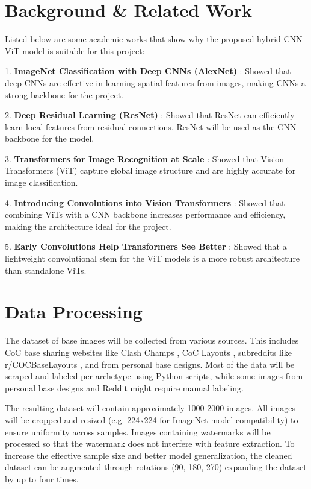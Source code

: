 \documentclass[final]{article}
\begin{document}
\section*{Background \& Related Work}

Listed below are some academic works that show why the proposed hybrid CNN-ViT model is suitable for this project:

1. \textbf{ImageNet Classification with Deep CNNs (AlexNet)} \cite{alexnet}: Showed that deep CNNs are effective in learning spatial features from images, making CNNs a strong backbone for the project.

2. \textbf{Deep Residual Learning (ResNet)} \cite{resnet}: Showed that ResNet can efficiently learn local features from residual connections. ResNet will be used as the CNN backbone for the model.

3. \textbf{Transformers for Image Recognition at Scale} \cite{tfir_vit1}: Showed that Vision Transformers (ViT) capture global image structure and are highly accurate for image classification.

4. \textbf{Introducing Convolutions into Vision Transformers} \cite{cvt}: Showed that combining ViTs with a CNN backbone increases performance and efficiency, making the architecture ideal for the project.

5. \textbf{Early Convolutions Help Transformers See Better} \cite{earlyconvvit}: Showed that a lightweight convolutional stem for the ViT models is a more robust architecture than standalone ViTs.

\section*{Data Processing}

The dataset of base images will be collected from various sources. This includes CoC base sharing websites like Clash Champs \cite{clashchamps}, CoC Layouts \cite{coclayouts}, subreddits like r/COCBaseLayouts \cite{srcocbaselayouts}, and from personal base designs. Most of the data will be scraped and labeled per archetype using Python scripts, while some images from personal base designs and Reddit might require manual labeling. 

The resulting dataset will contain approximately 1000-2000 images. All images will be cropped and resized (e.g. 224x224 for ImageNet model compatibility) to ensure uniformity across samples. Images containing watermarks will be processed so that the watermark does not interfere with feature extraction. To increase the effective sample size and better model generalization, the cleaned dataset can be augmented through rotations (90\textdegree, 180\textdegree, 270\textdegree) expanding the dataset by up to four times.
\end{document}
